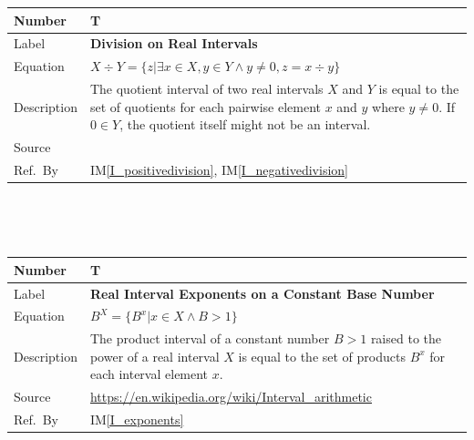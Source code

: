 \documentclass[12pt]{article}
\newcommand{\colAwidth}{0.13\textwidth}
\newcommand{\colBwidth}{0.82\textwidth}
\newcounter{theorynum} %
\newcommand{\iref}[1]{IM\ref{#1}}
\begin{document}
\noindent
\begin{minipage}{\textwidth}
	\renewcommand*{\arraystretch}{1.5}
	\begin{tabular}{| p{\colAwidth} | p{\colBwidth}|}
		\hline
		\rowcolor[gray]{0.9}
		Number& T{theorynum}\thetheorynum 
		\label{T_division}\\
		\hline
		Label&\bf Division on Real Intervals\\
		\hline
		Equation&  $X \div Y = \{z | \exists x \in X, y \in Y \wedge y \neq 0, 
		z = x \div y\}$\\
		\hline
		Description & The quotient interval of two real intervals $X$ and $Y$ 
		is equal to the set of quotients for each pairwise element $x$ and $y$ 
		where $y \neq 0$. If $0 \in Y$, the quotient itself might not be an 
		interval.\\
		\hline
		Source & \citet{intervalarithmetic}\\
		\hline
		Ref.\ By & \iref{I_positivedivision}, \iref{I_negativedivision}\\
		\hline
	\end{tabular}
\end{minipage}\\


~\newline

\noindent
\begin{minipage}{\textwidth}
	\renewcommand*{\arraystretch}{1.5}
	\begin{tabular}{| p{\colAwidth} | p{\colBwidth}|}
		\hline
		\rowcolor[gray]{0.9}
		Number& T{theorynum}\thetheorynum 
		\label{T_exponents}\\
		\hline
		Label&\bf Real Interval Exponents on a Constant Base Number\\
		\hline
		Equation&  $B^X = \{B^x | x \in X \wedge B > 1\}$\\
		\hline
		Description & The product interval of a constant number $B > 1$ raised 
		to the power of a real interval $X$ is equal to the set of products 
		$B^x$ for each interval element $x$.\\
		\hline
		Source & \url{https://en.wikipedia.org/wiki/Interval_arithmetic}\\
		\hline
		Ref.\ By & \iref{I_exponents}\\
		\hline
	\end{tabular}
\end{minipage}\\
\end{document}
